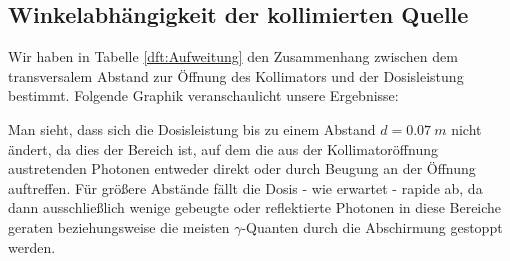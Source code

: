 \subsection{Winkelabhängigkeit der kollimierten Quelle}
Wir haben in Tabelle \ref{dft:Aufweitung} den Zusammenhang zwischen dem transversalem Abstand zur Öffnung des Kollimators und der Dosisleistung bestimmt. Folgende Graphik veranschaulicht unsere Ergebnisse:
\begin{center}
    \minipanf    
		\begin{center}    
        \label{fig:Aufweitung}
        \end{center}
    \minipend
    \vspace{5mm}
\end{center}
Man sieht, dass sich die Dosisleistung bis zu einem Abstand $d=0.07\ m$ nicht ändert, da dies der Bereich ist, auf dem die aus der Kollimatoröffnung austretenden Photonen entweder direkt oder durch Beugung an der Öffnung auftreffen. Für größere Abstände fällt die Dosis - wie erwartet - rapide ab, da dann ausschließlich wenige gebeugte oder reflektierte Photonen in diese Bereiche geraten beziehungsweise die meisten $\gamma$-Quanten durch die Abschirmung gestoppt werden.
